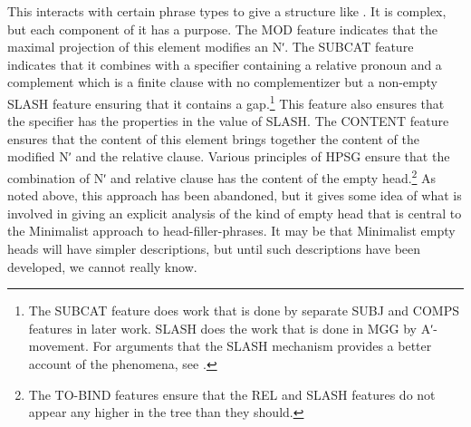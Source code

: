 \documentclass[output=paper]{langsci/langscibook}
\begin{document}
\ea\label{ex:key:4.8}
     \small
\z
%
This interacts with certain phrase types to give a structure like
. It is complex, but each component of it has a purpose. The MOD
feature indicates that the maximal projection of this element modifies an Nʹ.
The SUBCAT feature indicates that it combines with a specifier containing a
relative pronoun and a complement which is a finite clause with no
complementizer but a non-empty SLASH feature ensuring that it contains a
gap.\footnote{The SUBCAT feature does work that is done by separate SUBJ and
COMPS features in later work. SLASH does the work that is done in \gls{MGG} by
Aʹ-movement. For arguments that the SLASH mechanism provides a better account
of the phenomena, see \citet{Borsley2012}.} This feature also ensures that the
specifier has the properties in the value of SLASH. The CONTENT feature ensures
that the content of this element brings together the content of the modified Nʹ
and the relative clause. Various principles of \gls{HPSG} ensure that the
combination of Nʹ and relative clause has the content of the empty
head.\footnote{The TO-BIND features ensure that the REL and SLASH features do
not appear any higher in the tree than they should.} As noted above, this
approach has been abandoned, but it gives some idea of what is involved in
giving an explicit analysis of the kind of empty head that is central to the
Minimalist approach to head-filler-phrases.  It may be that Minimalist empty
heads will have simpler descriptions, but until such descriptions have been
developed, we cannot really know.
\end{document}
